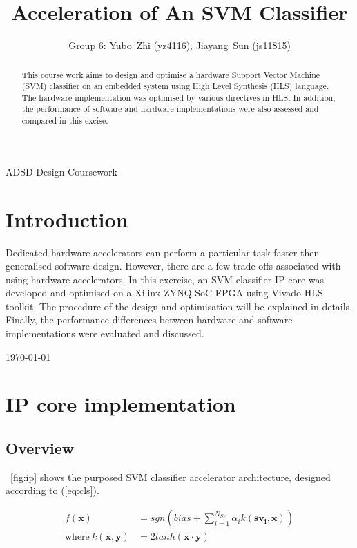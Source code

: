 \documentclass[journal]{IEEEtran}
\newcommand{\fref}[1]{\figurename~\ref{#1}}
\newcommand{\eref}[1]{(\ref{#1})}
\begin{document}
\title{Acceleration of An SVM Classifier}

\author{Group 6: Yubo~Zhi (yz4116), Jiayang~Sun (js11815)}

%
{ADSD Design Coursework}

\maketitle

\begin{abstract}
This course work aims to design and optimise a hardware Support Vector Machine (SVM) classifier on an embedded system using High Level Synthesis (HLS) language. The hardware implementation was optimised by various directives in HLS. In addition, the performance of software and hardware implementations were also assessed and compared in this excise.
\end{abstract}

\section{Introduction}

Dedicated hardware accelerators can perform a particular task faster then generalised software design. However, there are a few trade-offs associated with using hardware accelerators. In this exercise, an SVM classifier IP core was developed and optimised on a Xilinx ZYNQ SoC FPGA using Vivado HLS toolkit. The procedure of the design and optimisation will be explained in details. Finally, the performance differences between hardware and software implementations were evaluated and discussed.

\hfill \today

\section{IP core implementation}

\subsection{Overview}

\fref{fig:ip} shows the purposed SVM classifier accelerator architecture, designed according to \eref{eq:cls}.

\begin{align}
	f(\bm{x}) &= sgn \left( bias + \sum_{i=1}^{N_{SV}} \alpha_i k(\bm{{sv}_i}, \bm{x}) \right)
	\label{eq:cls}\\
	\text{where}~k(\bm{x}, \bm{y}) &= 2 tanh(\bm{x} \cdot \bm{y})
\end{align}
\end{document}
